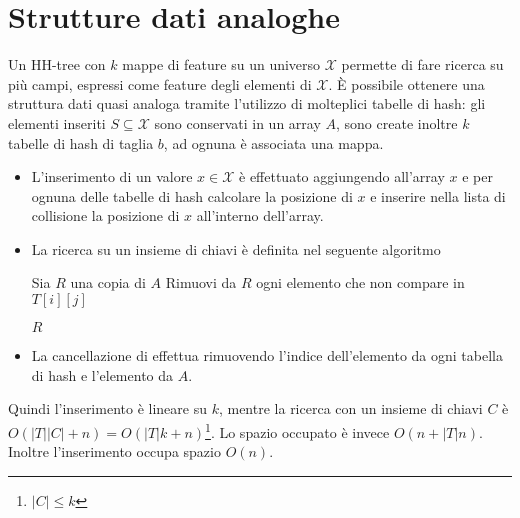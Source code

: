 \documentclass[a4paper]{article}
\begin{document}
\pagebreak

\section{Strutture dati analoghe}

Un HH-tree con $k$ mappe di feature su un universo $\mathcal{X}$ permette di fare ricerca su più campi, espressi come feature degli elementi di $\mathcal{X}$. È possibile ottenere una struttura dati quasi analoga tramite l'utilizzo di molteplici tabelle di hash: gli elementi inseriti $S \subseteq \mathcal{X}$ sono conservati in un array $A$, sono create inoltre $k$ tabelle di hash di taglia $b$, ad ognuna è associata una mappa.
\begin{itemize}
	\item L'inserimento di un valore $x \in \mathcal{X}$ è effettuato aggiungendo all'array $x$ e per ognuna delle tabelle di hash calcolare la posizione di $x$ e inserire nella lista di collisione la posizione di $x$ all'interno dell'array.
	\item La ricerca su un insieme di chiavi è definita nel seguente algoritmo
	\begin{algorithm}
		\DontPrintSemicolon

		\;


		Sia $R$ una copia di $A$ \;
		 {
			 {
				Rimuovi da $R$ ogni elemento che non compare in $T[i][j]$ \;
			}
		}

		\Return $R$ \;

		\;
	\end{algorithm}
	\item La cancellazione di effettua rimuovendo l'indice dell'elemento da ogni tabella di hash e l'elemento da $A$.
\end{itemize}

Quindi l'inserimento è lineare su $k$, mentre la ricerca con un insieme di chiavi $C$ è $O(|T||C| + n) = O(|T|k + n)$\footnote{$|C| \leq k$}. Lo spazio occupato è invece $O(n + |T|n)$. Inoltre l'inserimento occupa spazio $O(n)$.
\end{document}
